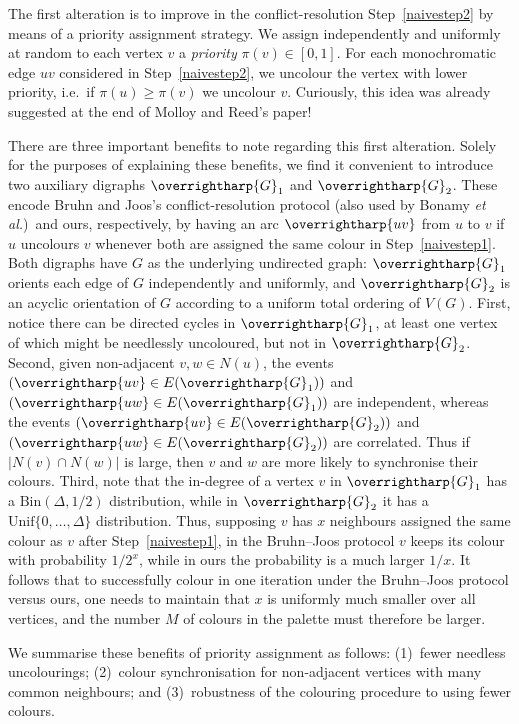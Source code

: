 \documentclass[11pt]{article}
\theoremstyle{plain}
\newcommand{\GBJ}{\overrightharp{G}_1}%
\newcommand{\GHJK}{\overrightharp{G}_2}%
\begin{document}
The first alteration is to improve in the conflict-resolution Step~\ref{naivestep2} by means of a priority assignment strategy.
We assign independently and uniformly at random to each vertex $v$ a {\em priority} $\pi(v) \in [0,1]$.
For each monochromatic edge $uv$ considered in Step~\ref{naivestep2}, we uncolour the vertex with lower priority, i.e.~if $\pi(u) \ge \pi(v)$ we uncolour $v$.
Curiously, this idea was already suggested at the end of Molloy and Reed's paper!

There are three important benefits to note regarding this first alteration. Solely for the purposes of explaining these benefits, we find it convenient to introduce two auxiliary digraphs $\GBJ$ and $\GHJK$. These encode Bruhn and Joos's conflict-resolution protocol (also used by Bonamy {\em et al.})~and ours, respectively, by having an arc $\overrightharp{uv}$ from $u$ to $v$ if $u$ uncolours $v$ whenever both are assigned the same colour in Step~\ref{naivestep1}.
Both digraphs have $G$ as the underlying undirected graph: $\GBJ$ orients each edge of $G$ independently and uniformly, and $\GHJK$ is an acyclic orientation of $G$ according to a uniform total ordering of $V(G)$.
First, notice there can be directed cycles in $\GBJ$, at least one vertex of which might be needlessly uncoloured, but not in $\GHJK$.
Second, given non-adjacent $v,w\in N(u)$, the events $(\overrightharp{uv}\in E(\GBJ))$ and $(\overrightharp{uw}\in E(\GBJ))$ are independent, whereas the events $(\overrightharp{uv}\in E(\GHJK))$ and $(\overrightharp{uw}\in E(\GHJK))$ are correlated. Thus if $|N(v)\cap N(w)|$ is large, then $v$ and $w$ are more likely to synchronise their colours.
Third, note that the in-degree of a vertex $v$ in $\GBJ$ has a $\mathrm{Bin}(\Delta,1/2)$ distribution, while in $\GHJK$ it has a $\mathrm{Unif}\{0,\dots,\Delta\}$ distribution. Thus, supposing $v$ has $x$ neighbours assigned the same colour as $v$ after Step~\ref{naivestep1}, in the Bruhn--Joos protocol $v$ keeps its colour with probability $1/2^x$, while in ours the probability is a much larger $1/x$.
It follows that to successfully colour in one iteration under the Bruhn--Joos protocol versus ours, one needs to maintain that $x$ is uniformly much smaller over all vertices, and the number $M$ of colours in the palette must therefore be larger.


We summarise these benefits of priority assignment as follows:
(1)~fewer needless uncolourings;
(2)~colour synchronisation for non-adjacent vertices with many common neighbours; and
(3)~robustness of the colouring procedure to using fewer colours.
\end{document}
